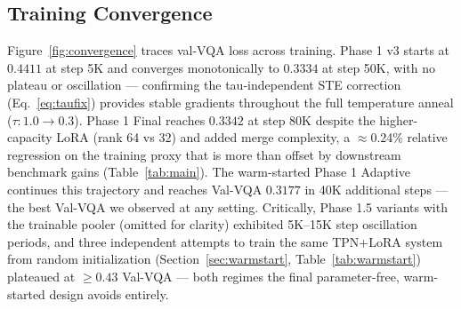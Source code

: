\documentclass{article}
\begin{document}
\begin{table}[t]
\caption{Compute budgets. The compute-matched comparison is TC-ViTok Final vs.
LoRA-576; the architectural comparison against published methods is not
compute-matched.}
\label{tab:compute}
\centering
{}
\end{table}

\subsection{Training Convergence}

Figure~\ref{fig:convergence} traces val-VQA loss across training.
Phase 1 v3 starts at $0.4411$ at step 5K and converges monotonically to $0.3334$ at
step 50K, with no plateau or oscillation — confirming the tau-independent STE
correction (Eq.~\ref{eq:taufix}) provides stable gradients throughout the full
temperature anneal ($\tau: 1.0 \to 0.3$).
Phase 1 Final reaches $0.3342$ at step 80K despite the higher-capacity LoRA
(rank 64 vs 32) and added merge complexity, a $\approx$0.24\% relative regression
on the training proxy that is more than offset by downstream benchmark gains
(Table~\ref{tab:main}).
The warm-started Phase 1 Adaptive continues this trajectory and reaches Val-VQA
$0.3177$ in 40K additional steps — the best Val-VQA we observed at any setting.
Critically, Phase 1.5 variants with the trainable pooler (omitted for clarity)
exhibited 5K--15K step oscillation periods, and three independent attempts to
train the same TPN+LoRA system from random initialization (Section~\ref{sec:warmstart},
Table~\ref{tab:warmstart}) plateaued at $\geq 0.43$ Val-VQA — both regimes the
final parameter-free, warm-started design avoids entirely.
\end{document}
